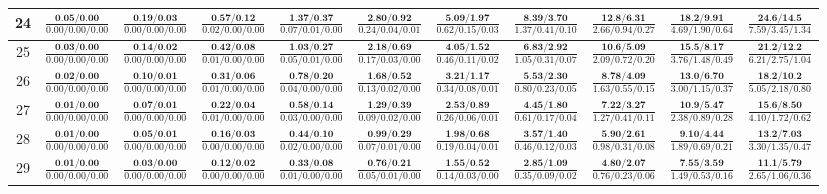 \documentclass{slides}
\begin{document}
{{{\begin{tabular}{|c|c|c|c|c|c|c|c|c|c|c|}
\hline
24 & $\frac{\textbf{0.05/0.00}}{0.00/0.00/0.00}$ & $\frac{\textbf{0.19/0.03}}{0.00/0.00/0.00}$ & $\frac{\textbf{0.57/0.12}}{0.02/0.00/0.00}$ & $\frac{\textbf{1.37/0.37}}{0.07/0.01/0.00}$ & $\frac{\textbf{2.80/0.92}}{0.24/0.04/0.01}$ & $\frac{\textbf{5.09/1.97}}{0.62/0.15/0.03}$ & $\frac{\textbf{8.39/3.70}}{1.37/0.41/0.10}$ & $\frac{\textbf{12.8/6.31}}{2.66/0.94/0.27}$ & $\frac{\textbf{18.2/9.91}}{4.69/1.90/0.64}$ & $\frac{\textbf{24.6/14.5}}{7.59/3.45/1.34}$ \\
\hline
25 & $\frac{\textbf{0.03/0.00}}{0.00/0.00/0.00}$ & $\frac{\textbf{0.14/0.02}}{0.00/0.00/0.00}$ & $\frac{\textbf{0.42/0.08}}{0.01/0.00/0.00}$ & $\frac{\textbf{1.03/0.27}}{0.05/0.01/0.00}$ & $\frac{\textbf{2.18/0.69}}{0.17/0.03/0.00}$ & $\frac{\textbf{4.05/1.52}}{0.46/0.11/0.02}$ & $\frac{\textbf{6.83/2.92}}{1.05/0.31/0.07}$ & $\frac{\textbf{10.6/5.09}}{2.09/0.72/0.20}$ & $\frac{\textbf{15.5/8.17}}{3.76/1.48/0.49}$ & $\frac{\textbf{21.2/12.2}}{6.21/2.75/1.04}$ \\
\hline
26 & $\frac{\textbf{0.02/0.00}}{0.00/0.00/0.00}$ & $\frac{\textbf{0.10/0.01}}{0.00/0.00/0.00}$ & $\frac{\textbf{0.31/0.06}}{0.01/0.00/0.00}$ & $\frac{\textbf{0.78/0.20}}{0.04/0.00/0.00}$ & $\frac{\textbf{1.68/0.52}}{0.13/0.02/0.00}$ & $\frac{\textbf{3.21/1.17}}{0.34/0.08/0.01}$ & $\frac{\textbf{5.53/2.30}}{0.80/0.23/0.05}$ & $\frac{\textbf{8.78/4.09}}{1.63/0.55/0.15}$ & $\frac{\textbf{13.0/6.70}}{3.00/1.15/0.37}$ & $\frac{\textbf{18.2/10.2}}{5.05/2.18/0.80}$ \\
\hline
27 & $\frac{\textbf{0.01/0.00}}{0.00/0.00/0.00}$ & $\frac{\textbf{0.07/0.01}}{0.00/0.00/0.00}$ & $\frac{\textbf{0.22/0.04}}{0.01/0.00/0.00}$ & $\frac{\textbf{0.58/0.14}}{0.03/0.00/0.00}$ & $\frac{\textbf{1.29/0.39}}{0.09/0.02/0.00}$ & $\frac{\textbf{2.53/0.89}}{0.26/0.06/0.01}$ & $\frac{\textbf{4.45/1.80}}{0.61/0.17/0.04}$ & $\frac{\textbf{7.22/3.27}}{1.27/0.41/0.11}$ & $\frac{\textbf{10.9/5.47}}{2.38/0.89/0.28}$ & $\frac{\textbf{15.6/8.50}}{4.10/1.72/0.62}$ \\
\hline
28 & $\frac{\textbf{0.01/0.00}}{0.00/0.00/0.00}$ & $\frac{\textbf{0.05/0.01}}{0.00/0.00/0.00}$ & $\frac{\textbf{0.16/0.03}}{0.00/0.00/0.00}$ & $\frac{\textbf{0.44/0.10}}{0.02/0.00/0.00}$ & $\frac{\textbf{0.99/0.29}}{0.07/0.01/0.00}$ & $\frac{\textbf{1.98/0.68}}{0.19/0.04/0.01}$ & $\frac{\textbf{3.57/1.40}}{0.46/0.12/0.03}$ & $\frac{\textbf{5.90/2.61}}{0.98/0.31/0.08}$ & $\frac{\textbf{9.10/4.44}}{1.89/0.69/0.21}$ & $\frac{\textbf{13.2/7.03}}{3.30/1.35/0.47}$ \\
\hline
29 & $\frac{\textbf{0.01/0.00}}{0.00/0.00/0.00}$ & $\frac{\textbf{0.03/0.00}}{0.00/0.00/0.00}$ & $\frac{\textbf{0.12/0.02}}{0.00/0.00/0.00}$ & $\frac{\textbf{0.33/0.08}}{0.01/0.00/0.00}$ & $\frac{\textbf{0.76/0.21}}{0.05/0.01/0.00}$ & $\frac{\textbf{1.55/0.52}}{0.14/0.03/0.00}$ & $\frac{\textbf{2.85/1.09}}{0.35/0.09/0.02}$ & $\frac{\textbf{4.80/2.07}}{0.76/0.23/0.06}$ & $\frac{\textbf{7.55/3.59}}{1.49/0.53/0.16}$ & $\frac{\textbf{11.1/5.79}}{2.65/1.06/0.36}$ \\

\end{tabular}}}}
\end{document}
